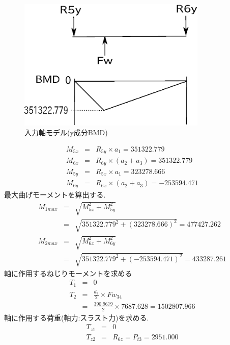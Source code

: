 \documentclass[a4j,twoside,openright,11pt]{jreport}
\begin{document}
\begin{figure}[htbp]
\begin{center}
\includegraphics[width=9cm]{jiku33.eps}
\end{center}
\caption{入力軸モデル(y成分BMD)}
\end{figure}
\begin{eqnarray}
M_{5x} &=& R_{5y} \times a_1=351322.779\\
M_{6x} &=& R_{6y} \times (a_2+a_3)=351322.779\\
M_{5y} &=& R_{5x} \times a_1=323278.666\\
M_{6y} &=& R_{6x} \times (a_2+a_3)=-253594.471
\end{eqnarray}
最大曲げモーメントを算出する.
\begin{eqnarray}
M_{1max} &=& \sqrt {M_{5x}^2+M_{5y}^2}\\
         &=& \sqrt {351322.779^2+(323278.666)^2}=477427.262\\
M_{2max} &=& \sqrt {M_{6x}^2+M_{6y}^2}\\
         &=& \sqrt {351322.779^2+(-253594.471)^2}=433287.261
\end{eqnarray}
軸に作用するねじりモーメントを求める
\begin{eqnarray}
T_{1} &=& 0\\
T_{2} &=& \frac{d_4}{2} \times Fw_{34}\\
      &=& \frac{390.9679}{2} \times 7687.628 = 1502807.966
\end{eqnarray}
軸に作用する荷重(軸力:スラスト力)を求める.
\begin{eqnarray}
T_{z1} &=& 0\\
T_{z2} &=& R_{6z} = P_{t3} = 2951.000
\end{eqnarray}
\end{document}
